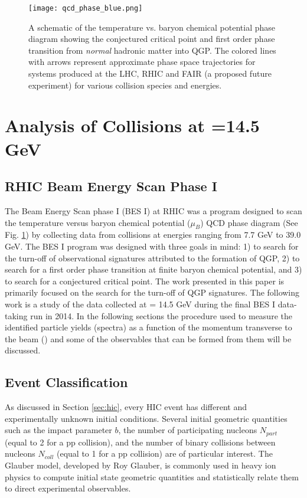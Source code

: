 \begin{figure}
		\centering 
		\texttt{[image: qcd\_phase\_blue.png]} 
		
		\caption{ \label{fig:qcd_phase_diagram}  A schematic of the temperature vs. baryon chemical potential phase diagram showing the conjectured critical point and first order phase transition from \textit{normal} hadronic matter into QGP\cite{mohanty_exploring_2013}. The colored lines with arrows represent approximate phase space trajectories for systems produced at the LHC, RHIC and FAIR (a proposed future experiment) for various collision species and \snn energies. } 
	\end{figure}

\section{Analysis of \texorpdfstring{\auau}{AuAu} Collisions at \texorpdfstring{\snn}{sqrt(sNN)}=14.5 GeV }
\label{sec:analysis}
	\subsection{RHIC Beam Energy Scan Phase I }
	\label{sec:besi}
	The Beam Energy Scan phase I (BES I) at RHIC was a program designed to scan the temperature versus baryon chemical potential ($\mu_B$) QCD phase diagram (See Fig. \ref{fig:qcd_phase_diagram}) by collecting data from \auau collisions at \snn energies ranging from 7.7 GeV to 39.0 GeV. The BES I program was designed with three goals in mind: 1) to search for the turn-off of observational signatures attributed to the formation of QGP, 2) to search for a first order phase transition at finite baryon chemical potential, and 3) to search for a conjectured critical point. The work presented in this paper is primarily focused on the search for the turn-off of QGP signatures. The following work is a study of the \auau data collected at \snn = 14.5 GeV during the final BES I data-taking run in 2014. In the following sections the procedure used to measure the identified particle yields (spectra) as a function of the momentum transverse to the beam (\pt) and some of the observables that can be formed from them will be discussed.


	\subsection{Event Classification}
	\label{sec:mc_glauber}

	As discussed in Section \ref{sec:hic}, every HIC event has different and experimentally unknown initial conditions. Several initial geometric quantities such as the impact parameter $b$, the number of participating nucleons $N_{part}$ (equal to 2 for a pp collision), and the number of binary collisions between nucleons $N_{coll}$ (equal to 1 for a pp collision) are of particular interest. The Glauber model, developed by Roy Glauber, is commonly used in heavy ion physics to compute initial state geometric quantities and statistically relate them to direct experimental observables\cite{miller_glauber_2007}. 


